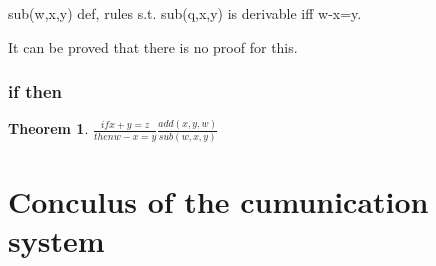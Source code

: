 \documentclass[a4paper,10pt,titlepage]{report}
\newtheorem{theorem}{Theorem}
\begin{document}
sub(w,x,y) def, rules s.t. sub(q,x,y) is derivable iff w-x=y.

It can be proved that there is no proof for this.



\subsubsection{if then}

\begin{theorem}

$\frac{if x+y=z}{then w-x=y}\frac{add(x,y,w)}{sub(w,x,y)}$

\end{theorem}

\newpage

\section{Conculus of the cumunication system}
\end{document}
